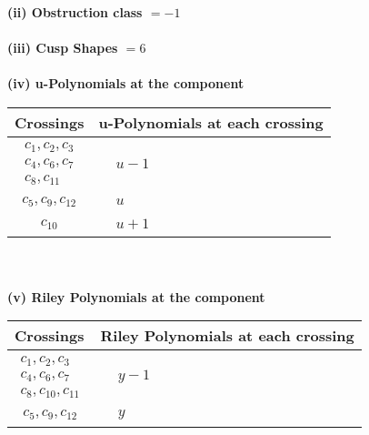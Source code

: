 \documentclass[1p]{elsarticle_modified}
\theoremstyle{definition}
\begin{document}
\flushleft \textbf{(ii) Obstruction class $= -1$}\\~\\
\flushleft \textbf{(iii) Cusp Shapes $= 6$}\\~\\
\newpage\renewcommand{\arraystretch}{1}
\flushleft \textbf{(iv) u-Polynomials at the component}\newline \\
\begin{tabular}{m{50pt}|m{274pt}}
Crossings & \hspace{64pt}u-Polynomials at each crossing \\
\hline $$\begin{aligned}c_{1},c_{2},c_{3}\\c_{4},c_{6},c_{7}\\c_{8},c_{11}\end{aligned}$$&$\begin{aligned}
&u-1
\end{aligned}$\\
\hline $$\begin{aligned}c_{5},c_{9},c_{12}\end{aligned}$$&$\begin{aligned}
&u
\end{aligned}$\\
\hline $$\begin{aligned}c_{10}\end{aligned}$$&$\begin{aligned}
&u+1
\end{aligned}$\\
\hline
\end{tabular}\\~\\
\newpage\renewcommand{\arraystretch}{1}
\flushleft \textbf{(v) Riley Polynomials at the component}\newline \\
\begin{tabular}{m{50pt}|m{274pt}}
Crossings & \hspace{64pt}Riley Polynomials at each crossing \\
\hline $$\begin{aligned}c_{1},c_{2},c_{3}\\c_{4},c_{6},c_{7}\\c_{8},c_{10},c_{11}\end{aligned}$$&$\begin{aligned}
&y-1
\end{aligned}$\\
\hline $$\begin{aligned}c_{5},c_{9},c_{12}\end{aligned}$$&$\begin{aligned}
&y
\end{aligned}$\\
\hline
\end{tabular}\\~\\
\end{document}
